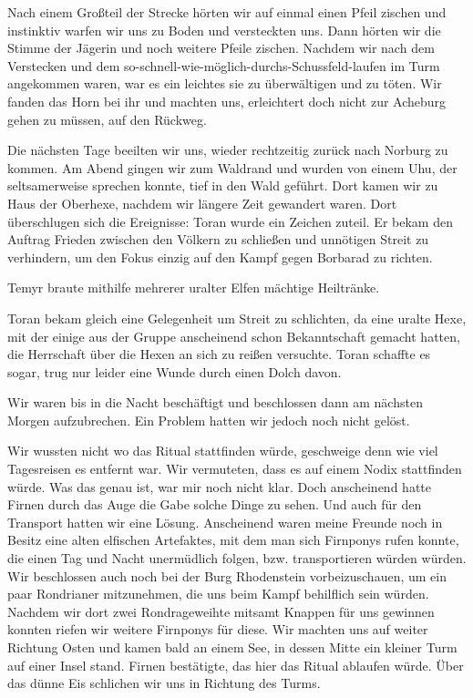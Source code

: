 Nach einem Großteil der Strecke hörten wir auf einmal einen Pfeil zischen und instinktiv warfen wir uns zu Boden und versteckten uns. Dann hörten wir die Stimme der Jägerin und noch weitere Pfeile zischen.
Nachdem wir nach dem Verstecken und dem so-schnell-wie-möglich-durchs-Schussfeld-laufen im Turm angekommen waren, war es ein leichtes sie zu überwältigen und zu töten. Wir fanden das Horn bei ihr und machten uns, erleichtert doch nicht zur Acheburg gehen zu müssen, auf den Rückweg.

Die nächsten Tage beeilten wir uns, wieder rechtzeitig zurück nach Norburg zu kommen. Am Abend gingen wir zum Waldrand und wurden von einem Uhu, der seltsamerweise sprechen konnte, tief in den Wald geführt. Dort kamen wir zu Haus der Oberhexe, nachdem wir längere Zeit gewandert waren. Dort überschlugen sich die Ereignisse:
Toran wurde ein Zeichen zuteil. Er bekam den Auftrag Frieden zwischen den Völkern zu schließen und unnötigen Streit zu verhindern, um den Fokus einzig auf den Kampf gegen Borbarad zu richten.

Temyr braute mithilfe mehrerer uralter Elfen mächtige Heiltränke.

Toran bekam gleich eine Gelegenheit um Streit zu schlichten, da eine uralte Hexe, mit der einige aus der Gruppe anscheinend schon Bekanntschaft gemacht hatten, die Herrschaft über die Hexen an sich zu reißen versuchte. Toran schaffte es sogar, trug nur leider eine Wunde durch einen Dolch davon.

Wir waren bis in die Nacht beschäftigt und beschlossen dann am nächsten Morgen aufzubrechen. Ein Problem hatten wir jedoch noch nicht gelöst.

Wir wussten nicht wo das Ritual stattfinden würde, geschweige denn wie viel Tagesreisen es entfernt war. Wir vermuteten, dass es auf einem Nodix stattfinden würde. Was das genau ist, war mir noch nicht klar. Doch anscheinend hatte Firnen durch das Auge die Gabe solche Dinge zu sehen. Und auch für den Transport hatten wir eine Lösung. Anscheinend waren meine Freunde noch in Besitz eine alten elfischen Artefaktes, mit dem man sich Firnponys rufen konnte, die einen Tag und Nacht unermüdlich folgen, bzw. transportieren würden würden. Wir beschlossen auch noch bei der Burg Rhodenstein vorbeizuschauen, um ein paar Rondrianer mitzunehmen, die uns beim Kampf behilflich sein würden. Nachdem wir dort zwei Rondrageweihte mitsamt Knappen für uns gewinnen konnten riefen wir weitere Firnponys für diese. Wir machten uns auf weiter Richtung Osten und kamen bald an einem See, in dessen Mitte ein kleiner Turm auf einer Insel stand. Firnen bestätigte, das hier das Ritual ablaufen würde. Über das dünne Eis schlichen wir uns in Richtung des Turms. 


